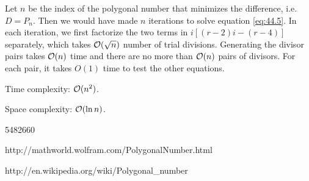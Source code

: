 \complexity

Let $n$ be the index of the polygonal number that minimizes the difference, i.e. $D = P_n$. Then we would have made $n$ iterations to solve equation \eqref{eq:44.5}. In each iteration, we first factorize the two terms in $i[(r-2)i-(r-4)]$ separately, which takes $\mathcal{O}(\sqrt{n})$ number of trial divisions. Generating the divisor pairs takes $\mathcal{O}(n)$ time and there are no more than $\mathcal{O}(n)$ pairs of divisors. For each pair, it takes $O(1)$ time to test the other equations.

Time complexity: $\mathcal{O}(n^2)$.

Space complexity: $\mathcal{O}(\ln n)$.

\answer

5482660


http://mathworld.wolfram.com/PolygonalNumber.html

http://en.wikipedia.org/wiki/Polygonal\_number

 